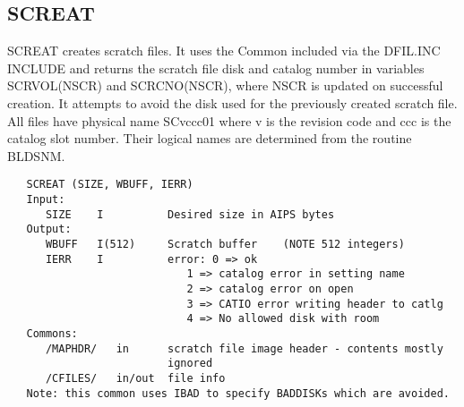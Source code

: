 \subsection{SCREAT}
SCREAT creates scratch files.  It uses the
Common included via the DFIL.INC INCLUDE and returns
the scratch file disk and catalog number in variables SCRVOL(NSCR)
and SCRCNO(NSCR), where NSCR is updated on successful creation.
It attempts to avoid the disk used for the previously created
scratch file.  All files have physical name SCvccc01 where v is the
revision code and ccc is the catalog slot number.  Their logical
names are determined from the routine BLDSNM.
\begin{verbatim}
   SCREAT (SIZE, WBUFF, IERR)
   Input:
      SIZE    I          Desired size in AIPS bytes
   Output:
      WBUFF   I(512)     Scratch buffer    (NOTE 512 integers)
      IERR    I          error: 0 => ok
                            1 => catalog error in setting name
                            2 => catalog error on open
                            3 => CATIO error writing header to catlg
                            4 => No allowed disk with room
   Commons:
      /MAPHDR/   in      scratch file image header - contents mostly
                         ignored
      /CFILES/   in/out  file info
   Note: this common uses IBAD to specify BADDISKs which are avoided.
\end{verbatim}



